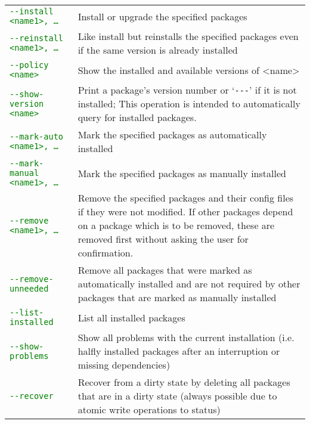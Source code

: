 \documentclass[a4paper]{article}
\newcommand{\green}[1]{\textcolor{green}{#1}}
\begin{document}
	\bgroup
	\def\arraystretch{1.5}
	\begin{tabularx}{\textwidth}{lX}
		\green{\texttt{-{}-install <name1>, \dots}} & Install or upgrade the specified packages \\
		
		\green{\texttt{-{}-reinstall <name1>, \dots}} & Like install but reinstalls the specified packages even if the same version is already installed \\
		
		\green{\texttt{-{}-policy <name>}} & Show the installed and available versions of <name> \\
		
		\green{\texttt{-{}-show-version <name>}} & Print a package's version number or `\texttt{-{}-{}-}' if it is not installed; This operation is intended to automatically query for installed packages. \\
		
		\green{\texttt{-{}-mark-auto <name1>, \dots}} & Mark the specified packages as automatically installed \\
		
		\green{\texttt{-{}-mark-manual <name1>, \dots}} & Mark the specified packages as manually installed \\
		
		\green{\texttt{-{}-remove <name1>, \dots}} & Remove the specified packages and their config files if they were not modified. If other packages depend on a package which is to be removed, these are removed first without asking the user for confirmation. \\
		
		\green{\texttt{-{}-remove-unneeded}} & Remove all packages that were marked as automatically installed and are not required by other packages that are marked as manually installed \\
		
		\green{\texttt{-{}-list-installed}} & List all installed packages \\
		
		\green{\texttt{-{}-show-problems}} & Show all problems with the current installation (i.e. halfly installed packages after an interruption or missing dependencies) \\
		
		\green{\texttt{-{}-recover}} & Recover from a dirty state by deleting all packages that are in a dirty state (always possible due to atomic write operations to status) \\
		

\end{tabularx}
\end{document}
